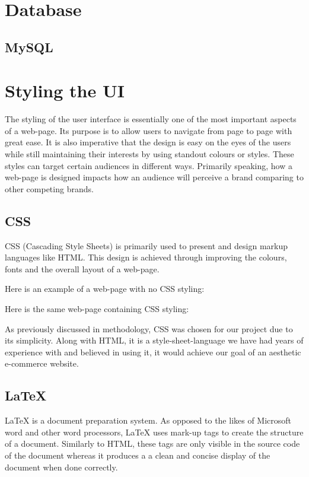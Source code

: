 \section{Database}
\subsection{MySQL}

\section{Styling the UI}
The styling of the user interface is essentially one of the most important aspects of a web-page. Its purpose is to allow users to navigate from page to page with great ease. It is also imperative that the design is easy on the eyes of the users while still maintaining their interests by using standout colours or styles. These styles can target certain audiences in different ways. Primarily speaking, how a web-page is designed impacts how an audience will perceive a brand comparing to other competing brands.

\subsection{CSS}
CSS (Cascading Style Sheets) is primarily used to present and design markup languages like HTML. This design is achieved through improving the colours, fonts and the overall layout of a web-page.

Here is an example of a web-page with no CSS styling:

Here is the same web-page containing CSS styling:

As previously discussed in methodology, CSS was chosen for our project due to its simplicity. Along with HTML, it is a style-sheet-language we have had years of experience with and believed in using it, it would achieve our goal of an aesthetic e-commerce website.

\subsection{LaTeX}
LaTeX is a document preparation system. As opposed to the likes of Microsoft word and other word processors, LaTeX uses mark-up tags to create the structure of a document. Similarly to HTML, these tags are only visible in the source code of the document whereas it produces a a clean and concise display of the document when done correctly.


